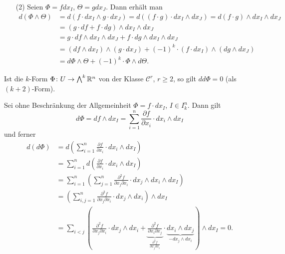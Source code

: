 \documentclass[a4paper,twoside,DIV15,BCOR12mm]{scrbook}
\newcommand{\bw}{\bigwedge\nolimits}
\begin{document}
\begin{beweis}
\begin{enumerate}
\item[\quad(2)] Seien $\Phi = fdx_I$, $\Theta = gdx_J$. Dann erhält man
\begin{align*}
d(\Phi \wedge \Theta) &= d(f\cdot dx_I \wedge g\cdot dx_J)
= d( (f\cdot g)\cdot dx_I \wedge dx_J )
= d(f\cdot g) \wedge dx_I \wedge dx_J \\
&= (g\cdot df + f \cdot dg) \wedge dx_I \wedge dx_J \\
&= g\cdot df \wedge dx_I \wedge dx_J + f\cdot dg \wedge dx_I \wedge dx_J \\
&= (df \wedge dx_I) \wedge (g\cdot dx_J) + (-1)^k\cdot (f\cdot dx_I ) \wedge (dg\wedge dx_J)\\
&= d\Phi \wedge \Theta + (-1)^k \cdot \Phi \wedge d\Theta.
\end{align*}
\end{enumerate}
\end{beweis}

\begin{lemma}
\label{lem:4.2}
Ist die $k$-Form $\Phi\colon U\to \bw^k\MdR^n$ von der Klasse $\mathcal C^r$, $r\ge 2$, so gilt $dd\Phi = 0$ (als $(k+2)$-Form).
\end{lemma}

\begin{beweis}
Sei ohne Beschränkung der Allgemeinheit $\Phi = f\cdot dx_I$, $I\in I_k^n$. Dann gilt 
\[
d\Phi = df \wedge dx_I = \sum_{i=1}^n \frac{\partial f}{\partial x_i} \cdot dx_i \wedge dx_I 
\]
und ferner
\begin{align*}
d(d\Phi) &= d(\sum_{i=1}^n \frac{\partial f}{\partial x_i} \cdot dx_i \wedge dx_I)\\
&= \sum_{i=1}^n d(\frac{\partial f}{\partial x_i} \cdot dx_i \wedge dx_I)\\
&= \sum_{i=1}^n (\sum_{j=1}^n \frac{\partial^2 f}{\partial x_j \partial x_i} \cdot dx_j \wedge dx_i \wedge dx_I) \\
&= (\sum_{i,j=1}^n \frac{\partial^2 f}{\partial x_j \partial x_i} \cdot dx_j \wedge dx_i) \wedge dx_I \\
&= \sum_{i<j}( \frac{\partial^2 f}{\partial x_j \partial x_i}\cdot dx_j \wedge dx_i + \underbrace{\frac{\partial^2 f}{\partial x_i \partial x_j}}_{\frac{\partial^2 f}{\partial x_j \partial x_i}} \cdot \underbrace{dx_i \wedge dx_j}_{-dx_j \wedge dx_i}) \wedge dx_I = 0.
\end{align*}
\end{beweis}
\end{document}
